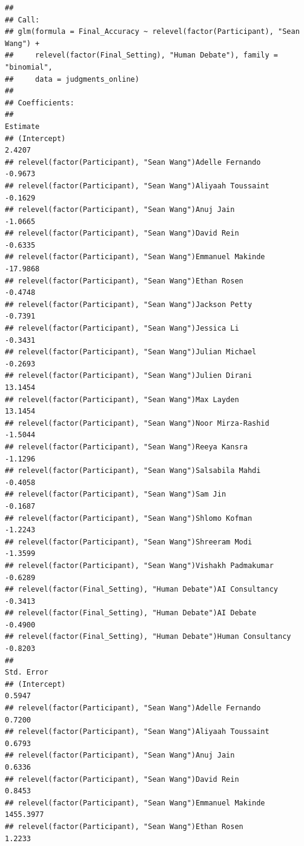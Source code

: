 \documentclass[
]{article}
\begin{document}
\begin{verbatim}
## 
## Call:
## glm(formula = Final_Accuracy ~ relevel(factor(Participant), "Sean Wang") + 
##     relevel(factor(Final_Setting), "Human Debate"), family = "binomial", 
##     data = judgments_online)
## 
## Coefficients:
##                                                                  Estimate
## (Intercept)                                                        2.4207
## relevel(factor(Participant), "Sean Wang")Adelle Fernando          -0.9673
## relevel(factor(Participant), "Sean Wang")Aliyaah Toussaint        -0.1629
## relevel(factor(Participant), "Sean Wang")Anuj Jain                -1.0665
## relevel(factor(Participant), "Sean Wang")David Rein               -0.6335
## relevel(factor(Participant), "Sean Wang")Emmanuel Makinde        -17.9868
## relevel(factor(Participant), "Sean Wang")Ethan Rosen              -0.4748
## relevel(factor(Participant), "Sean Wang")Jackson Petty            -0.7391
## relevel(factor(Participant), "Sean Wang")Jessica Li               -0.3431
## relevel(factor(Participant), "Sean Wang")Julian Michael           -0.2693
## relevel(factor(Participant), "Sean Wang")Julien Dirani            13.1454
## relevel(factor(Participant), "Sean Wang")Max Layden               13.1454
## relevel(factor(Participant), "Sean Wang")Noor Mirza-Rashid        -1.5044
## relevel(factor(Participant), "Sean Wang")Reeya Kansra             -1.1296
## relevel(factor(Participant), "Sean Wang")Salsabila Mahdi          -0.4058
## relevel(factor(Participant), "Sean Wang")Sam Jin                  -0.1687
## relevel(factor(Participant), "Sean Wang")Shlomo Kofman            -1.2243
## relevel(factor(Participant), "Sean Wang")Shreeram Modi            -1.3599
## relevel(factor(Participant), "Sean Wang")Vishakh Padmakumar       -0.6289
## relevel(factor(Final_Setting), "Human Debate")AI Consultancy      -0.3413
## relevel(factor(Final_Setting), "Human Debate")AI Debate           -0.4900
## relevel(factor(Final_Setting), "Human Debate")Human Consultancy   -0.8203
##                                                                 Std. Error
## (Intercept)                                                         0.5947
## relevel(factor(Participant), "Sean Wang")Adelle Fernando            0.7200
## relevel(factor(Participant), "Sean Wang")Aliyaah Toussaint          0.6793
## relevel(factor(Participant), "Sean Wang")Anuj Jain                  0.6336
## relevel(factor(Participant), "Sean Wang")David Rein                 0.8453
## relevel(factor(Participant), "Sean Wang")Emmanuel Makinde        1455.3977
## relevel(factor(Participant), "Sean Wang")Ethan Rosen                1.2233

\end{verbatim}
\end{document}
